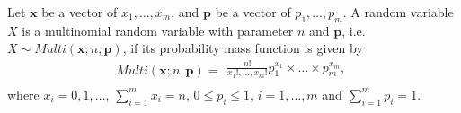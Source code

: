 \begin{definition2}
	Let $\mathbf{x}$ be a vector of $x_1, \ldots, x_m$, and $\mathbf p$ be a vector of $p_1, \ldots, p_m$. A random variable $X$ is a multinomial random variable with parameter $n$ and $\mathbf p$, i.e. $X \sim Multi(\mathbf x ; n, \mathbf p)$, if its probability mass function is given by
	\[
	Multi(\mathbf x ; n, \mathbf p) = \begin{array}{lll}
	\displaystyle \frac{n!}{x_1!, \ldots, x_m!} p^{x_1}_1 \times \ldots \times p^{x_m}_m, \\ 
	\end{array}
	\]
	\noindent where $x_i = 0, 1, \ldots$, $\displaystyle\sum_{i=1}^{m} x_i = n$, $0 \leq p_i \leq 1$, $i = 1, \ldots, m$ and $\displaystyle\sum_{i=1}^{m} p_i = 1$.
\end{definition2}